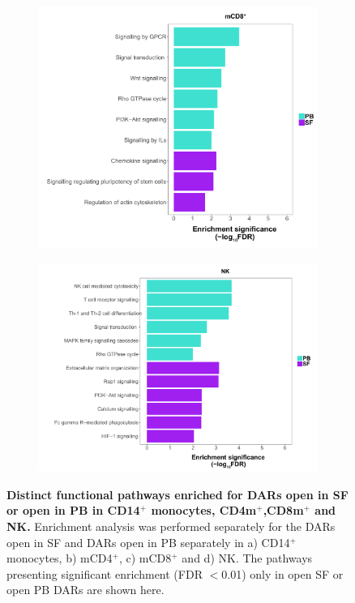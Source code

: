 \begin{figure}[H]
\begin{subfigure}[b]{0.45\textwidth}
\centering
\includegraphics[width=\textwidth]{./Results3/pdfs/ATAC_PSA_CD8_pathways_barplot_all_DOCS_proximity}%
\caption{}
\end{subfigure}
\begin{subfigure}[b]{0.45\textwidth} 
\centering
\includegraphics[width=\textwidth]{./Results3/pdfs/ATAC_PSA_NK_pathways_barplot_all_DOCS_proximity}%
\caption{}
\end{subfigure}
\caption[Distinct functional pathways enriched for DARs open in SF or open in PB in CD14$^+$ monocytes, CD4m$^+$,CD8m$^+$ and NK.]{\textbf{Distinct functional pathways enriched for DARs open in SF or open in PB in CD14$^+$ monocytes, CD4m$^+$,CD8m$^+$ and NK.} Enrichment analysis was performed separately for the DARs open in SF and DARs open in PB separately in a) CD14$^+$ monocytes, b) mCD4$^+$, c) mCD8$^+$ and d) NK. The pathways presenting significant enrichment (FDR $<$0.01) only in open SF or open PB DARs are shown here.}
\label{figure:PSA_ATAC_pathway_analysis_all_DOC}
\end{figure}


